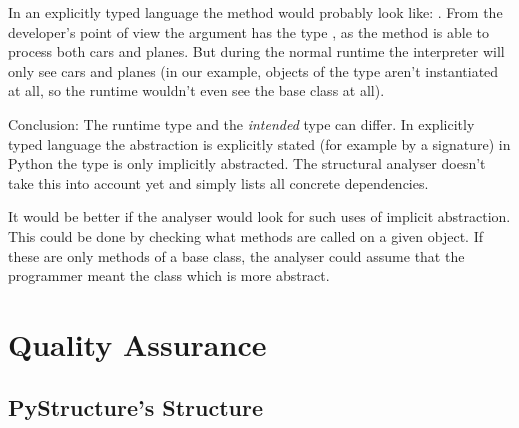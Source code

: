 \documentclass[12pt,halfparskip,DIV11,BCOR10mm]{scrreprt}
\begin{document}
In an explicitly typed language the  method would probably look like: . From the developer's point of view the argument has the type , as the method is able to process both cars and planes. But during the normal runtime the interpreter will only see cars and planes (in our example, objects of the type  aren't instantiated at all, so the runtime wouldn't even see the base class at all).

Conclusion: The runtime type and the \emph{intended} type can differ. In explicitly typed language the abstraction is explicitly stated (for example by a signature) in Python the type is only implicitly abstracted. The structural analyser doesn't take this into account yet and simply lists all concrete dependencies.

It would be better if the analyser would look for such uses of implicit abstraction. This could be done by checking what methods are called on a given object. If these are only methods of a base class, the analyser could assume that the programmer meant the class which is more abstract.


\chapter{Quality Assurance}



\section{PyStructure's Structure}
\end{document}
